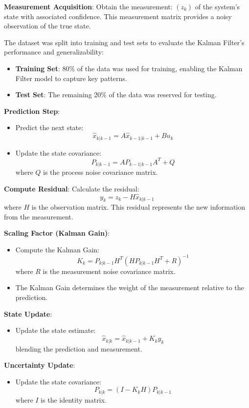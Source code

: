 \textbf{Measurement Acquisition}: Obtain the measurement:
$(z_k)$ of the system's state with associated confidence. This measurement matrix provides a noisy observation of the true state.

The dataset was split into training and test sets to evaluate the Kalman Filter's performance and generalizability:
\begin{itemize}
	\item \textbf{Training Set}: 80\% of the data was used for training, enabling the Kalman Filter model to capture key patterns.
	\item \textbf{Test Set}: The remaining 20\% of the data was reserved for testing.
\end{itemize}

\textbf{Prediction Step}:
\begin{itemize}
	\item Predict the next state:
	\[
	\hat{x}_{k|k-1} = A \hat{x}_{k-1|k-1} + B u_k
	\]
	
	\item Update the state covariance:
	\[
	P_{k|k-1} = A P_{k-1|k-1} A^T + Q
	\]
	where \( Q \) is the process noise covariance matrix.
\end{itemize}

\textbf{Compute Residual}: Calculate the residual:
\[
y_k = z_k - H \hat{x}_{k|k-1}
\]
where \( H \) is the observation matrix. This residual represents the new information from the measurement.

\textbf{Scaling Factor (Kalman Gain)}:
\begin{itemize}
	\item Compute the Kalman Gain:
	\[
	K_k = P_{k|k-1} H^T \left( H P_{k|k-1} H^T + R \right)^{-1}
	\]
	where \( R \) is the measurement noise covariance matrix.
	
	\item The Kalman Gain determines the weight of the measurement relative to the prediction.
\end{itemize}

\textbf{State Update}:
\begin{itemize}
	\item Update the state estimate:
	\[
	\hat{x}_{k|k} = \hat{x}_{k|k-1} + K_k y_k
	\]
	blending the prediction and measurement.
\end{itemize}

\textbf{Uncertainty Update}:
\begin{itemize}
	\item Update the state covariance:
	\[
	P_{k|k} = (I - K_k H) P_{k|k-1}
	\]
	where \( I \) is the identity matrix.
\end{itemize}


